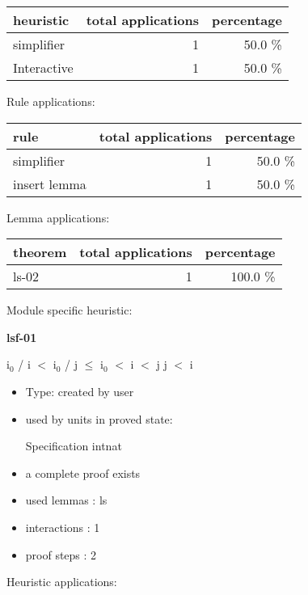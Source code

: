 \documentclass[a4paper]{article}
\begin{document}
\begin{supertabular}{l|r|r}
heuristic	& total applications & percentage \\ \hline
simplifier & 1 & 50.0 \% \\
Interactive & 1 & 50.0 \% \\

\end{supertabular}

Rule applications:

\begin{supertabular}{l|r|r}
rule	        & total applications & percentage \\ \hline
simplifier & 1 & 50.0 \% \\
insert lemma & 1 & 50.0 \% \\

\end{supertabular}

Lemma applications:

\begin{supertabular}{l|r|r}
theorem	        & total applications & percentage \\ \hline
ls-02 & 1 & 100.0 \% \\

\end{supertabular}

Module specific heuristic:

\pagebreak

{\LARGE\bf lsf-01}\label{lemma-lsf-01}

\medskip

 \Fol $\mbox{i}_{0}$ / i $<$ $\mbox{i}_{0}$ / j  $\le$ $\mbox{i}_{0}$  $<$ i  $<$ j \Imp j $<$ i

\begin{itemize}

\item Type: created by user

\item used by units in proved state:

Specification intnat
\item       a complete proof exists
\item       used lemmas  : ls
\item       interactions : 1
\item       proof steps  : 2
\end{itemize}

\medskip


Heuristic applications:
\end{document}
